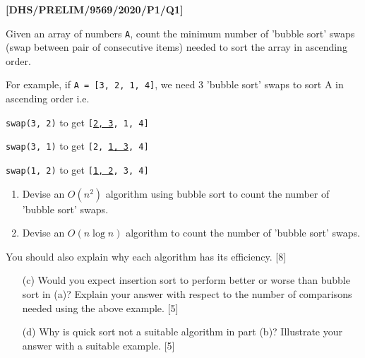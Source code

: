 \item \textbf{{[}DHS/PRELIM/9569/2020/P1/Q1{]} }

Given an array of numbers \texttt{A}, count the minimum number of
'bubble sort' swaps (swap between pair of consecutive items) needed
to sort the array in ascending order. 

For example, if \texttt{A = {[}3, 2, 1, 4{]}}, we need 3 'bubble sort'
swaps to sort A in ascending order i.e. 

\texttt{swap(3, 2)} to get \texttt{{[}}\texttt{\uline{2, 3}}\texttt{,
1, 4{]} }

\texttt{swap(3, 1)} to get \texttt{{[}2, }\texttt{\uline{1, 3}}\texttt{,
4{]}} 

\texttt{swap(1, 2)} to get \texttt{{[}}\texttt{\uline{1, 2}}\texttt{,
3, 4{]}} 
\begin{enumerate}
\item Devise an $O(n^{2})$ algorithm using bubble sort to count the number
of 'bubble sort' swaps. 
\item Devise an $O(n\log n)$ algorithm to count the number of 'bubble sort'
swaps. 
\end{enumerate}
You should also explain why each algorithm has its efficiency. \hfill{}{[}8{]}
\begin{enumerate}
\item[(c)] Would you expect insertion sort to perform better or worse than bubble
sort in (a)? Explain your answer with respect to the number of comparisons
needed using the above example.\hfill{} {[}5{]}
\item[(d)] Why is quick sort not a suitable algorithm in part (b)? Illustrate
your answer with a suitable example. \hfill{}{[}5{]}
\end{enumerate}